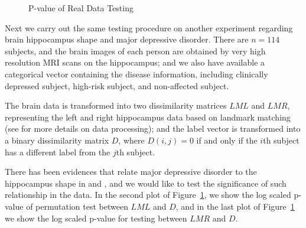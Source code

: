 \documentclass[12pt]{article}
\begin{document}
\begin{figure}[htbp]
\centering
{}
\hfil
\centering
{}
\hfil
\centering
{}
\caption{P-value of Real Data Testing}
\label{figReal}
\end{figure}

Next we carry out the same testing procedure on another experiment regarding brain hippocampus shape and major depressive disorder. There are $n=114$ subjects, and the brain images of each person are obtained by very high resolution MRI scans on the hippocampus; and we also have available a categorical vector containing the disease information, including clinically depressed subject, high-risk subject, and non-affected subject. 

The brain data is transformed into two dissimilarity matrices $LML$ and $LMR$, representing the left and right hippocampus data based on landmark matching (see \cite{ParkEtAl2011} for more details on data processing); and the label vector is transformed into a binary dissimilarity matrix $D$, where $D(i,j)=0$ if and only if the $i$th subject has a different label from the $j$th subject.

There has been evidences that relate major depressive disorder to the hippocampus shape in \cite{ParkEtAl2011} and \cite{PosenerEtAl2003}, and we would like to test the significance of such relationship in the data. In the second plot of Figure~\ref{figReal}, we show the log scaled p-value of permutation test between $LML$ and $D$, and in the last plot of Figure~\ref{figReal} we show the log scaled p-value for testing between $LMR$ and $D$. 
\end{document}
